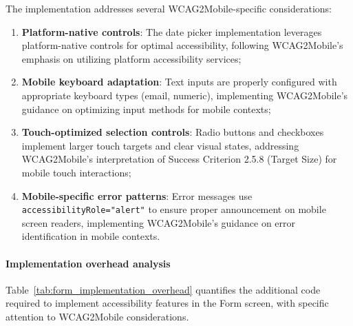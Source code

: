 The implementation addresses several WCAG2Mobile-specific considerations:

\begin{enumerate}
    \item \textbf{Platform-native controls}: The date picker implementation leverages platform-native controls for optimal accessibility, following WCAG2Mobile's emphasis on utilizing platform accessibility services;
    
    \item \textbf{Mobile keyboard adaptation}: Text inputs are properly configured with appropriate keyboard types (email, numeric), implementing WCAG2Mobile's guidance on optimizing input methods for mobile contexts;
    
    \item \textbf{Touch-optimized selection controls}: Radio buttons and checkboxes implement larger touch targets and clear visual states, addressing WCAG2Mobile's interpretation of Success Criterion 2.5.8 (Target Size) for mobile touch interactions;
    
    \item \textbf{Mobile-specific error patterns}: Error messages use \texttt{accessibilityRole="alert"} to ensure proper announcement on mobile screen readers, implementing WCAG2Mobile's guidance on error identification in mobile contexts.
\end{enumerate}

\paragraph{Implementation overhead analysis}

Table~\ref{tab:form_implementation_overhead} quantifies the additional code required to implement accessibility features in the Form screen, with specific attention to WCAG2Mobile considerations.

